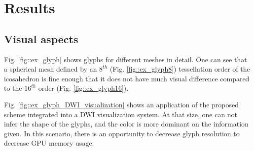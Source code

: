 \documentclass[twoside,twocolumn,10pt]{article}
\begin{document}



\section{Results}
\label{sec::results}

\subsection{Visual aspects}

Fig. \ref{fig::ex_glyph} shows glyphs for different meshes in detail. One can see that a spherical mesh defined by an $8^{th}$ (Fig. \ref{fig::ex_glyph8}) tessellation order of the icosahedron is fine enough that it does not have much visual difference compared to the $16^{th}$ order (Fig. \ref{fig::ex_glyph16}).

Fig. \ref{fig::ex_glyph_DWI_visualization} shows an application of the proposed scheme integrated into a DWI visualization system. At that size, one can not infer the shape of the glyphs, and the color is more dominant on the information given. In this scenario, there is an opportunity to decrease glyph resolution to decrease GPU memory usage.
\end{document}
